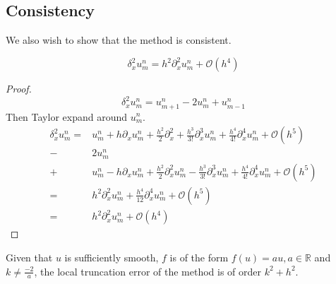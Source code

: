 \subsection{Consistency}
We also wish to show that the method is consistent. 
\begin{lemma}
    \label{central_difference}
    $$\delta_x^2u_{m}^{n} = h^2\partial_x^2 u_{m}^{n} + \mathcal{O}(h^4)$$
\end{lemma}
\begin{proof}
    $$\delta_x^2u_{m}^{n} = u_{m+1}^{n} - 2 u_{m}^{n} + u_{m-1}^{n}$$
    Then Taylor expand around $u_{m}^{n}$.
    \begin{align*}
        \delta_x^2u_{m}^{n} =& u_{m}^{n}  + h\partial_xu_{m}^{n} + \frac{h^2}{2}\partial_x^2 + \frac{h^3}{3!}\partial_x^3 u_{m}^{n} + \frac{h^4}{4!}\partial_x^4 u_{m}^{n} + \mathcal{O}(h^5) \\
        -&2u_{m}^{n} \\
        +& u_{m}^{n} - h\partial_xu_{m}^{n} + \frac{h^2}{2}\partial_x^2 u_{m}^{n} - \frac{h^3}{3!}\partial_x^3u_{m}^{n} + \frac{h^4}{4!}\partial_x^4 u_{m}^{n} + \mathcal{O}(h^5) \\
        =& h^2\partial_x^2 u_{m}^{n} + \frac{h^4}{12}\partial_x^4 u_{m}^{n} + \mathcal{O}(h^5) \\
        =&  h^2\partial_x^2 u_{m}^{n} + \mathcal{O}(h^4)
    \end{align*}
\end{proof}

\begin{theorem}
    \label{consistent}
    Given that $u$ is sufficiently smooth,  $f$ is of the form $f(u)=au, a\in \mathbb{R}$ and $k \neq \frac{-2}{a}$, the local truncation error of the method is of order $k^2 + h^2.$
\end{theorem}

